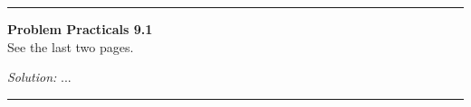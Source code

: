 \documentclass[a4paper, 11pt]{article}
\newenvironment{problem}[2][Problem]
    { \begin{mdframed}[backgroundcolor=gray!20] \textbf{#1 #2} \\}
    {  \end{mdframed}}
\newenvironment{solution}
    {\textit{Solution:}}
    {}
\begin{document}
\noindent\rule{7in}{2.8pt}

\begin{problem}{Practicals 9.1}
See the last two pages.
\end{problem}
\begin{solution}
...
\end{solution}

\noindent\rule{7in}{2.8pt}







% 
\end{document}
